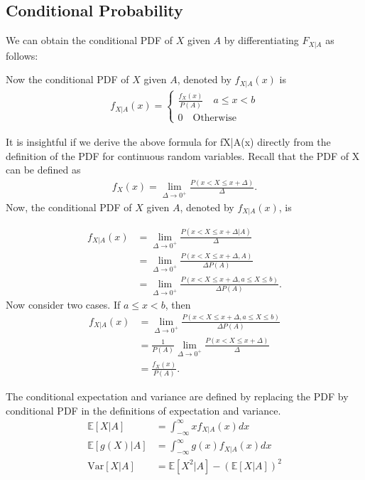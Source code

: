 \subsection{Conditional Probability}
We can obtain the conditional PDF of $X$ given $A$ by differentiating $F_{X|A}$ as follows:

Now the conditional PDF of $X$ given $A$, denoted by $f_{X|A}(x)$ is 
\begin{align*}
	f_{X|A}(x) = 
	\begin{cases}
	\frac{f_{X}(x)}{P(A)}\quad a\leq x <b\\	
	0\quad \text{Otherwise}\
	\end{cases}
\end{align*}

It is insightful if we derive the above formula for fX|A(x) directly from the definition of the PDF for continuous random variables. Recall that the PDF of X can be defined as
\begin{align*}
	f_X(x)=\lim_{\Delta \rightarrow 0^+} \frac{P(x<X \leq x+\Delta)}{\Delta}.
\end{align*}
Now, the conditional PDF of $X$ given $A$, denoted by $f_{X|A}(x)$, is

\begin{align*}
	 f_{X|A}(x)&=\lim_{\Delta \rightarrow 0^+} \frac{P(x<X \leq x+\Delta|A)}{\Delta}\\
	 &=\lim_{\Delta \rightarrow 0^+} \frac{P(x<X \leq x+\Delta,A)}{\Delta P(A)}\\
	 &=\lim_{\Delta \rightarrow 0^+} \frac{P(x<X \leq x+\Delta,a \leq X \leq b)}{\Delta P(A)}.
\end{align*}
Now consider two cases. If $a\leq x < b$, then
\begin{align*}
	 f_{X|A}(x)&=\lim_{\Delta \rightarrow 0^+} \frac{P(x<X \leq x+\Delta,a \leq X \leq b)}{\Delta P(A)}\\
	 &=\frac{1}{P(A)}\lim_{\Delta \rightarrow 0^+} \frac{P(x<X \leq x+\Delta)}{\Delta}\\
	 &=\frac{f_X(x)}{P(A)}.
\end{align*}

The conditional expectation and variance are defined by replacing the PDF by conditional PDF in the definitions of expectation and variance. 
\begin{align*}
	\mathbb{E}[X|A] &= \int_{-\infty}^{\infty}xf_{X|A}(x)dx\\
	\mathbb{E}[g(X)|A]	&= \int_{-\infty}^{\infty}g(x)f_{X|A}(x)dx\\
	\text{Var}[X|A]	&=\mathbb{E}[X^2|A]-\left(\mathbb{E}[X|A]\right)^2
\end{align*}

